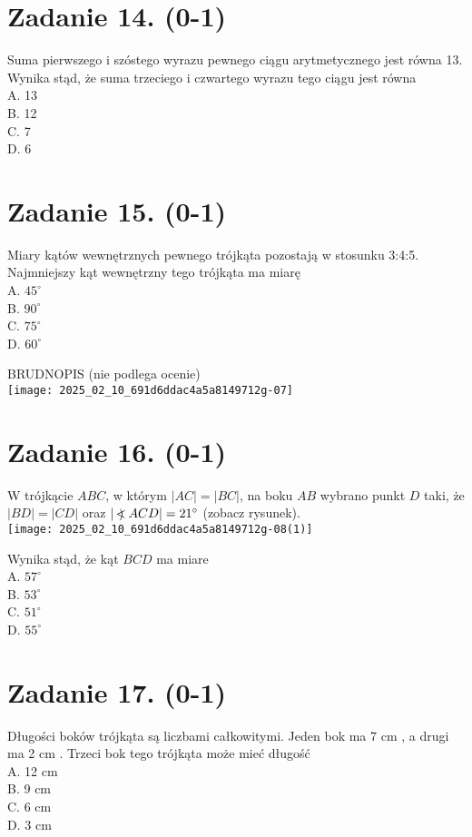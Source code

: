 \documentclass[10pt]{article}
\newcommand\Varangle{\mathop{{<\!\!\!\!\!\text{\small)}}\:}\nolimits}
\begin{document}
\section*{Zadanie 14. (0-1)}
Suma pierwszego i szóstego wyrazu pewnego ciągu arytmetycznego jest równa 13. Wynika stąd, że suma trzeciego i czwartego wyrazu tego ciągu jest równa\\
A. 13\\
B. 12\\
C. 7\\
D. 6

\section*{Zadanie 15. (0-1)}
Miary kątów wewnętrznych pewnego trójkąta pozostają w stosunku 3:4:5. Najmniejszy kąt wewnętrzny tego trójkąta ma miarę\\
A. \(45^{\circ}\)\\
B. \(90^{\circ}\)\\
C. \(75^{\circ}\)\\
D. \(60^{\circ}\)

BRUDNOPIS (nie podlega ocenie)\\
\texttt{[image: 2025\_02\_10\_691d6ddac4a5a8149712g-07]}

\section*{Zadanie 16. (0-1)}
W trójkącie \(A B C\), w którym \(|A C|=|B C|\), na boku \(A B\) wybrano punkt \(D\) taki, że \(|B D|=|C D|\) oraz \(|\Varangle A C D|=21^{\circ}\) (zobacz rysunek).\\
\texttt{[image: 2025\_02\_10\_691d6ddac4a5a8149712g-08(1)]}

Wynika stąd, że kąt \(B C D\) ma miare\\
A. \(57^{\circ}\)\\
B. \(53^{\circ}\)\\
C. \(51^{\circ}\)\\
D. \(55^{\circ}\)

\section*{Zadanie 17. (0-1)}
Długości boków trójkąta są liczbami całkowitymi. Jeden bok ma 7 cm , a drugi ma 2 cm . Trzeci bok tego trójkąta może mieć długość\\
A. 12 cm\\
B. 9 cm\\
C. 6 cm\\
D. 3 cm
\end{document}
